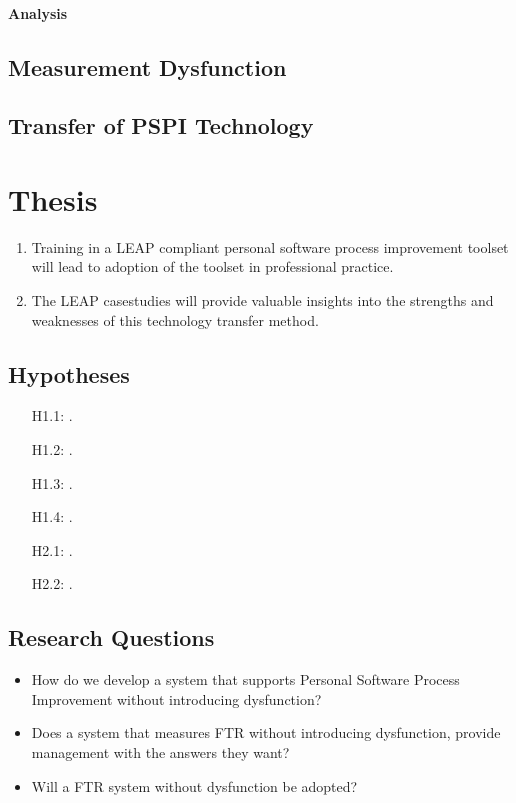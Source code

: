 \paragraph{Analysis}

\subsection{Measurement Dysfunction}

\subsection{Transfer of PSPI Technology}



\section{Thesis}
\begin{enumerate}
  
\item {Training in a LEAP compliant personal software process improvement
    toolset will lead to adoption of the toolset in professional practice.}
  
\item {The LEAP casestudies will provide valuable insights into the strengths
    and weaknesses of this technology transfer method.}

\end{enumerate}

\subsection{Hypotheses}
\begin{enumerate}
\item[H1.1:]{.}
\item[H1.2:]{.}
\item[H1.3:]{.}
\item[H1.4:]{.}
\item[H2.1:]{.}
\item[H2.2:]{.}
\end{enumerate}

\subsection{Research Questions}
\begin{itemize}
\item{How do we develop a system that supports Personal Software Process Improvement without introducing
dysfunction?}
\item{Does a system that measures FTR without introducing dysfunction,
provide management with the answers they want?}
\item{Will a FTR system without dysfunction be adopted?}
\end{itemize}



